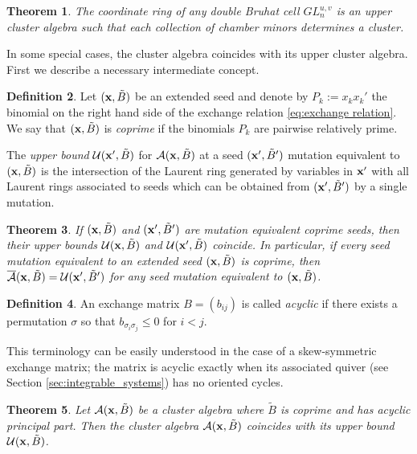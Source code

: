 \documentclass{amsart}
\newtheorem{theorem}{Theorem}[section]
\theoremstyle{definition}
\newtheorem{definition}[theorem]{Definition}
\theoremstyle{remark}
\numberwithin{equation}{section}
\newcommand{\cA}{{\mathcal{A}}}
\newcommand{\cU}{{\mathcal{U}}}
\newcommand{\x}{{\bf x}}
\newcommand{\bx}{{\bf x}}
\begin{document}
  \begin{theorem}\label{th:dbc is uca}\cite{BFZ05}
    The coordinate ring of any double Bruhat cell $GL_n^{u,v}$ is an upper cluster algebra such that each collection of chamber minors determines a cluster.
  \end{theorem}

  In some special cases, the cluster algebra coincides with its upper cluster algebra.  First we describe a necessary intermediate concept.
  \begin{definition}\label{def:coprime}
    Let $(\bx,\tilde B)$ be an extended seed and denote by $P_k:=x_kx_k'$ the binomial on the right hand side of the exchange relation \eqref{eq:exchange relation}.  We say that $(\bx,\tilde B)$ is \emph{coprime} if the binomials $P_k$ are pairwise relatively prime.
  \end{definition}
  The \emph{upper bound} $\cU(\bx',\tilde B)$ for $\cA(\bx,\tilde B)$ at a seed $(\bx',\tilde B')$ mutation equivalent to $(\bx,\tilde B)$ is the intersection of the Laurent ring generated by variables in $\bx'$ with all Laurent rings associated to seeds which can be obtained from $(\bx',\tilde B')$ by a single mutation.
  \begin{theorem}\cite{BFZ05}
    If $(\bx,\tilde B)$ and $(\bx',\tilde B')$ are mutation equivalent coprime seeds, then their upper bounds $\cU(\bx,\tilde B)$ and $\cU(\bx',\tilde B)$ coincide.  In particular, if every seed mutation equivalent to an extended seed $(\bx,\tilde B)$ is coprime, then $\overline{\cA}(\bx,\tilde B)=\cU(\bx',\tilde B')$ for any seed mutation equivalent to $(\bx,\tilde B)$.
  \end{theorem}

  \begin{definition}
    An exchange matrix $B=(b_{ij})$ is called \emph{acyclic} if there exists a permutation $\sigma$ so that $b_{\sigma_i\sigma_j}\le 0$ for $i<j$.
  \end{definition}
  This terminology can be easily understood in the case of a skew-symmetric exchange matrix; the matrix is acyclic exactly when its associated quiver (see Section \ref{sec:integrable_systems}) has no oriented cycles.
  \begin{theorem}\cite{BFZ05}\label{th:acyclic upper bounds}
    Let $\cA(\x,\tilde B)$ be a cluster algebra where $\tilde B$ is coprime and has acyclic principal part.  Then the cluster algebra $\cA(\x,\tilde B)$ coincides with its upper bound $\cU(\x,\tilde B)$.
  \end{theorem}
\end{document}
